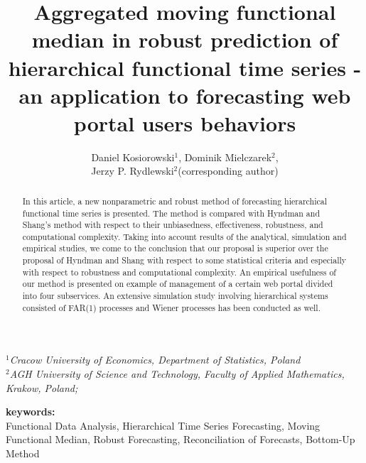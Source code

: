 \documentclass[12pt,a4paper]{article}
\title{Aggregated moving functional median in robust prediction of hierarchical functional time series  - an application to forecasting web portal users behaviors}
\author{Daniel Kosiorowski$^1$, Dominik Mielczarek$^2$,
\\ Jerzy P. Rydlewski$^2$(corresponding author)}
\numberwithin{equation}{section}
\begin{document}
\maketitle
\begin{center} 
$^1$\textit{Cracow University of Economics, Department of Statistics, Poland}
\\ $^2$\textit{AGH University of Science and Technology, Faculty of Applied Mathematics, Krakow, Poland;} 

\end{center}






\begin{abstract}
In this article, a new nonparametric and robust method of forecasting hierarchical functional time series is presented. The method is compared with Hyndman and Shang's method with respect to their unbiasedness, effectiveness, robustness, and computational complexity. Taking into account results of the analytical, simulation and empirical studies, we come to the conclusion that our proposal is superior over the proposal of Hyndman and Shang with respect to some statistical criteria and especially with respect to robustness and computational complexity. An empirical usefulness of our method is presented on example of  management of a certain web portal divided into four subservices. An extensive simulation study involving hierarchical systems consisted of FAR(1) processes and Wiener processes has been conducted as well.  
\end{abstract}
\textbf{keywords:}
\\ Functional Data Analysis, Hierarchical Time Series Forecasting, Moving Functional Median, Robust Forecasting, Reconciliation of Forecasts, Bottom-Up Method
\end{document}
